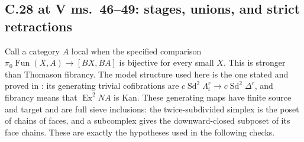 \subsection{C.28 at V ms.~46--49: stages, unions, and strict retractions}
Call a category $A$ local when the specified comparison
$\pi_0\operatorname{Fun}(X,A)\to[BX,BA]$ is bijective for every small
$X$. This is stronger than Thomason fibrancy. The model structure used
here is the one stated and proved in
\cite[Theorem~2.3]{may2017posets}: its generating trivial cofibrations
are $c\operatorname{Sd}^2\Lambda_i^r\to c\operatorname{Sd}^2\Delta^r$,
and fibrancy means that $\operatorname{Ex}^2NA$ is Kan. These generating
maps have finite source and target and are full sieve inclusions: the
twice-subdivided simplex is the poset of chains of faces, and a
subcomplex gives the downward-closed subposet of its face chains.
These are exactly the hypotheses used in the following checks.

